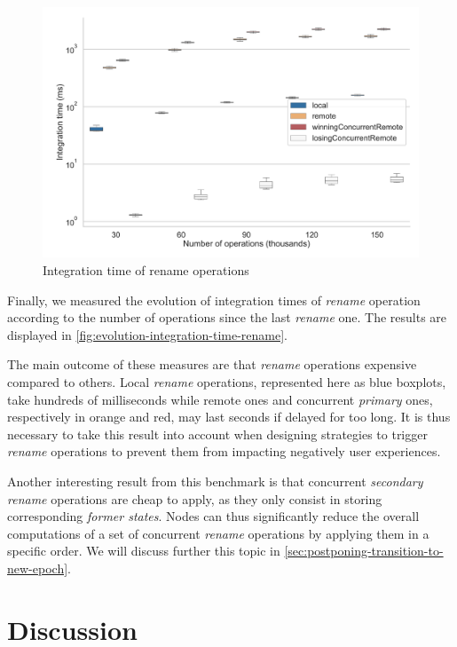 \documentclass[sigplan,10pt]{acmart}
\begin{document}
\begin{figure}[ht!]
    \centering
    \includegraphics[width=\columnwidth]{img/integration-time-boxplot-rename-op-without-outliers.pdf}
    \caption{Integration time of rename operations}
    \label{fig:evolution-integration-time-rename}
\end{figure}

Finally, we measured the evolution of integration times of \emph{rename} operation according to the number of operations since the last \emph{rename} one.
The results are displayed in \autoref{fig:evolution-integration-time-rename}.

The main outcome of these measures are that \emph{rename} operations expensive compared to others.
Local \emph{rename} operations, represented here as blue boxplots, take hundreds of milliseconds while remote ones and concurrent \emph{primary} ones, respectively in orange and red, may last seconds if delayed for too long.
It is thus necessary to take this result into account when designing strategies to trigger \emph{rename} operations to prevent them from impacting negatively user experiences.

Another interesting result from this benchmark is that concurrent \emph{secondary rename} operations are cheap to apply, as they only consist in storing corresponding \emph{former states}.
Nodes can thus significantly reduce the overall computations of a set of concurrent \emph{rename} operations by applying them in a specific order.
We will discuss further this topic in \autoref{sec:postponing-transition-to-new-epoch}.

\section{Discussion}
\end{document}
